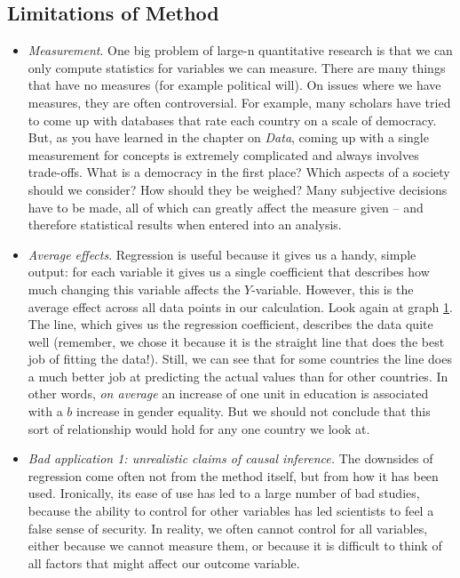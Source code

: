 \documentclass{book}
\begin{document}
\hypertarget{limitations-of-method}{%
\subsection{Limitations of Method}\label{limitations-of-method}}

\begin{itemize}
\item
  \emph{Measurement}. One big problem of large-n quantitative research is that
  we can only compute statistics for variables we can measure. There are many
  things that have no measures (for example political will). On issues where
  we have measures, they are often controversial. For example, many scholars
  have tried to come up with databases that rate each country on a scale of
  democracy. But, as you have learned in the chapter on \emph{Data}, coming up
  with a single measurement for concepts is extremely complicated and always
  involves trade-offs. What is a democracy in the first place? Which aspects
  of a society should we consider? How should they be weighed? Many subjective
  decisions have to be made, all of which can greatly affect the measure given
  -- and therefore statistical results when entered into an analysis.
\item
  \emph{Average effects}. Regression is useful because it gives us a handy,
  simple output: for each variable it gives us a single coefficient that
  describes how much changing this variable affects the \(Y\)-variable.
  However, this is the average effect across all data points in our
  calculation. Look again at graph \protect\hyperlink{fig:scatter}{1}. The
  line, which gives us the regression coefficient, describes the data quite
  well (remember, we chose it because it is the straight line that does the
  best job of fitting the data!). Still, we can see that for some countries
  the line does a much better job at predicting the actual values than for
  other countries. In other words, \emph{on average} an increase of one unit
  in education is associated with a \(b\) increase in gender equality. But we
  should not conclude that this sort of relationship would hold for any one
  country we look at.
\item
  \emph{Bad application 1: unrealistic claims of causal inference.} The
  downsides of regression come often not from the method itself, but from how
  it has been used. Ironically, its ease of use has led to a large number of
  bad studies, because the ability to control for other variables has led
  scientists to feel a false sense of security. In reality, we often cannot
  control for all variables, either because we cannot measure them, or because
  it is difficult to think of all factors that might affect our outcome
  variable.


\end{itemize}
\end{document}
